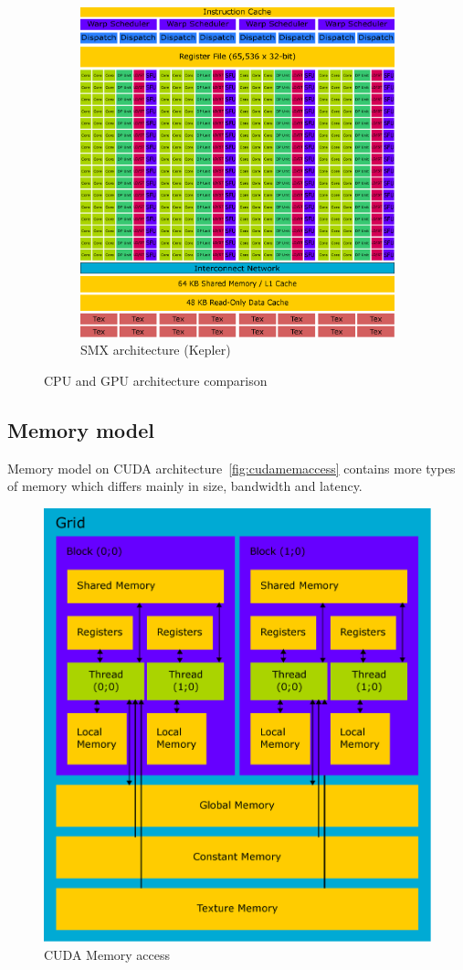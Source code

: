 \begin{figure}[p]
\begin{subfigure}{0.6\textwidth}
  \centering
  \includegraphics[width=0.9\linewidth]{img/SMXArchitecture.eps}
  \caption{SMX architecture (Kepler)}
  \label{fig:smxarchitecture}
\end{subfigure}
\caption{CPU and GPU architecture comparison}
\end{figure}

\subsection{Memory model}

Memory model on CUDA architecture~\autoref{fig:cudamemaccess} contains more types of memory which differs mainly in size, bandwidth and latency.

\begin{figure}[h]
  \centering
  \includegraphics[width=0.6\linewidth]{img/CUDAmemAccess.eps}
  \caption{CUDA Memory access}
  \label{fig:cudamemaccess}
\end{figure}

